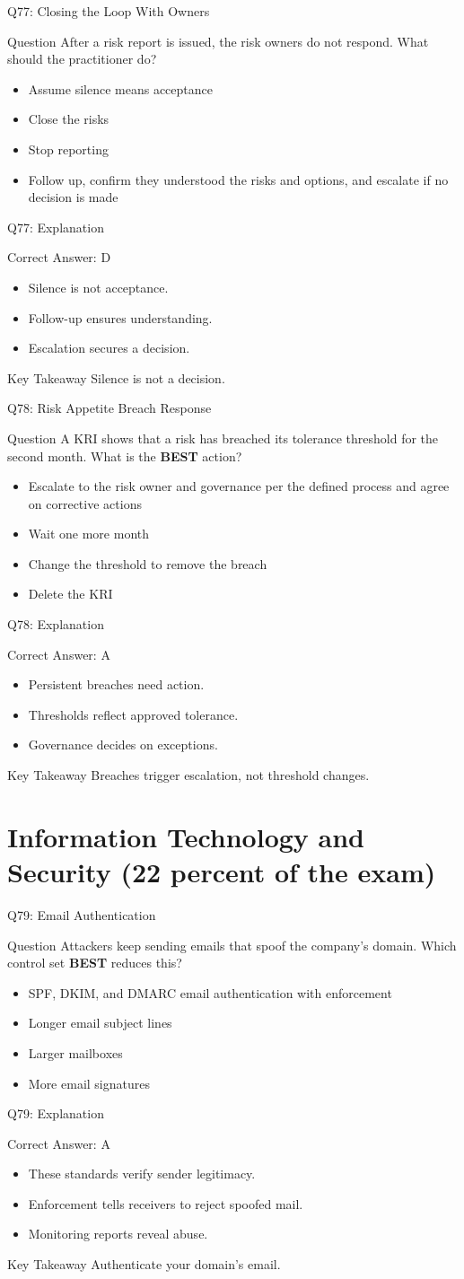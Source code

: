 \documentclass[aspectratio=169]{beamer}
\newcommand{\hq}[7]{%
	\begin{frame}{Q#1: #2}
		\begin{block}{Question}
			#3
		\end{block}
		\begin{itemize}
			#4
		\end{itemize}
	\end{frame}
	\begin{frame}{Q#1: Explanation}
		\begin{block}{Correct Answer: #5}
			\begin{itemize}
				#6
			\end{itemize}
		\end{block}
		\begin{alertblock}{Key Takeaway}
			#7
		\end{alertblock}
	\end{frame}
}
\begin{document}
	\hq{77}{Closing the Loop With Owners}
	{After a risk report is issued, the risk owners do not respond. What should the practitioner do?}
	{\item[\textbf{(A)}] Assume silence means acceptance
		\item[\textbf{(B)}] Close the risks
		\item[\textbf{(C)}] Stop reporting
		\item[\textbf{(D)}] Follow up, confirm they understood the risks and options, and escalate if no decision is made}
	{D}
	{\item Silence is not acceptance.
		\item Follow-up ensures understanding.
		\item Escalation secures a decision.}
	{Silence is not a decision.}
	
	\hq{78}{Risk Appetite Breach Response}
	{A KRI shows that a risk has breached its tolerance threshold for the second month. What is the \textbf{BEST} action?}
	{\item[\textbf{(A)}] Escalate to the risk owner and governance per the defined process and agree on corrective actions
		\item[\textbf{(B)}] Wait one more month
		\item[\textbf{(C)}] Change the threshold to remove the breach
		\item[\textbf{(D)}] Delete the KRI}
	{A}
	{\item Persistent breaches need action.
		\item Thresholds reflect approved tolerance.
		\item Governance decides on exceptions.}
	{Breaches trigger escalation, not threshold changes.}
	
	\section{Information Technology and Security (22 percent of the exam)}
	
	\hq{79}{Email Authentication}
	{Attackers keep sending emails that spoof the company's domain. Which control set \textbf{BEST} reduces this?}
	{\item[\textbf{(A)}] SPF, DKIM, and DMARC email authentication with enforcement
		\item[\textbf{(B)}] Longer email subject lines
		\item[\textbf{(C)}] Larger mailboxes
		\item[\textbf{(D)}] More email signatures}
	{A}
	{\item These standards verify sender legitimacy.
		\item Enforcement tells receivers to reject spoofed mail.
		\item Monitoring reports reveal abuse.}
	{Authenticate your domain's email.}
	
\end{document}
